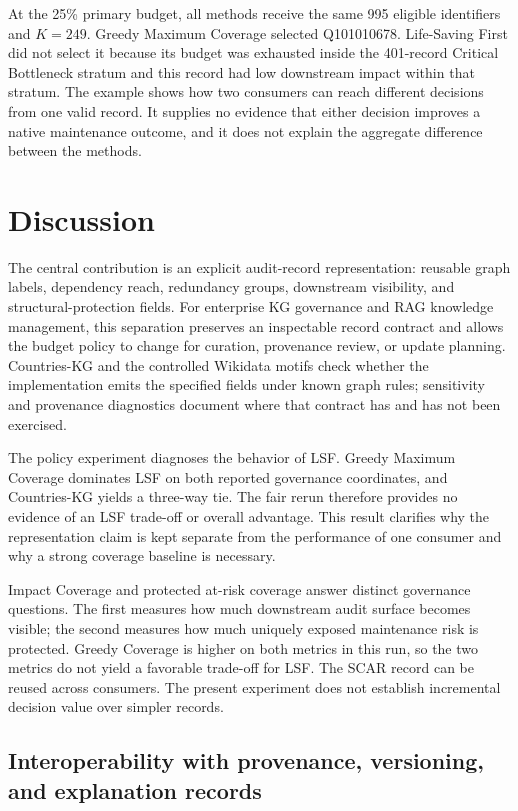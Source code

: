 \documentclass[pdflatex,sn-basic]{sn-jnl}
\begin{document}
At the 25\% primary budget, all methods receive the same 995 eligible identifiers and $K=249$. Greedy Maximum Coverage selected Q101010678. Life-Saving First did not select it because its budget was exhausted inside the 401-record Critical Bottleneck stratum and this record had low downstream impact within that stratum. The example shows how two consumers can reach different decisions from one valid record. It supplies no evidence that either decision improves a native maintenance outcome, and it does not explain the aggregate difference between the methods.

\section{Discussion}
\label{sec:discussion}

The central contribution is an explicit audit-record representation: reusable graph labels, dependency reach, redundancy groups, downstream visibility, and structural-protection fields. For enterprise KG governance and RAG knowledge management, this separation preserves an inspectable record contract and allows the budget policy to change for curation, provenance review, or update planning. Countries-KG and the controlled Wikidata motifs check whether the implementation emits the specified fields under known graph rules; sensitivity and provenance diagnostics document where that contract has and has not been exercised.

The policy experiment diagnoses the behavior of LSF. Greedy Maximum Coverage dominates LSF on both reported governance coordinates, and Countries-KG yields a three-way tie. The fair rerun therefore provides no evidence of an LSF trade-off or overall advantage. This result clarifies why the representation claim is kept separate from the performance of one consumer and why a strong coverage baseline is necessary.

Impact Coverage and protected at-risk coverage answer distinct governance questions. The first measures how much downstream audit surface becomes visible; the second measures how much uniquely exposed maintenance risk is protected. Greedy Coverage is higher on both metrics in this run, so the two metrics do not yield a favorable trade-off for LSF. The SCAR record can be reused across consumers. The present experiment does not establish incremental decision value over simpler records.

\subsection{Interoperability with provenance, versioning, and explanation records}
\end{document}
